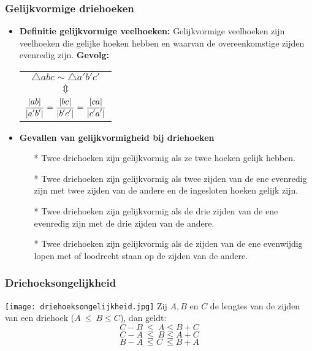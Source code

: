 \subsubsection{Gelijkvormige driehoeken} \label{gelijkvormige_driehoeken}
\hypertarget{gelijkvormige_driehoeken}{}
		\begin{itemize}%
		\item {\bf Definitie gelijkvormige veelhoeken:} Gelijkvormige veelhoeken zijn 		veelhoeken die gelijke hoeken hebben en waarvan de overeenkomstige zijden evenredig 		zijn.\newline
		{\bf Gevolg:}\newline\newline
		\begin{tabular}{c}
		$\triangle{abc} \sim \triangle{a'b'c'}$\\
				 $\Updownarrow$ 	\\
            $\displaystyle\frac{\displaystyle |ab|}{\displaystyle |a'b'|}=\frac{\displaystyle |bc|}{\displaystyle |b'c'|}=\frac{\displaystyle |ca|}{\displaystyle |c'a'|}$ \\ 		\end{tabular}		
		\item {\bf Gevallen van gelijkvormigheid bij driehoeken}
			\begin{itemize}%
			\item[*] Twee driehoeken zijn gelijkvormig als ze twee hoeken gelijk hebben.
			\item[*] Twee driehoeken zijn gelijkvormig als twee zijden van de ene evenredig 			zijn met twee zijden van de andere en de ingesloten hoeken gelijk zijn.
			\item[*] Twee driehoeken zijn gelijkvormig als de drie zijden van de ene 			evenredig zijn met de drie zijden van de andere.
			\item[*] Twee driehoeken zijn gelijkvormig als de zijden van de ene evenwijdig 			lopen met of loodrecht staan op de zijden van de andere.
			\end{itemize}%
		\end{itemize}%

\subsubsection{Driehoeksongelijkheid} \label{driehoeksongelijkheid}
\hypertarget{driehoeksongelijkheid}{}

\texttt{[image: driehoeksongelijkheid.jpg]}
		Zij $A, B$ en $C$ de lengtes van de zijden van een driehoek ($A\:\leq\: B\leq 		C$), dan geldt:
		\[C-B\:\leq \:A\leq B+C\]
		\[C-A\:\leq \:B\leq A+C\]
		\[B-A\:\leq C\:\leq B+A\]

